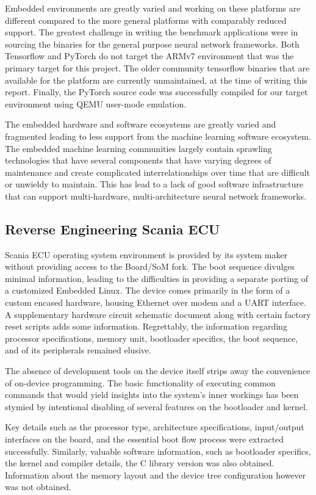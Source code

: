Embedded environments are greatly varied and working on these platforms are different compared to the more general platforms with comparably reduced support. The greatest challenge in writing the benchmark applications were in sourcing the binaries for the general purpose neural network frameworks. Both Tensorflow and PyTorch do not target the ARMv7 environment that was the primary target for this project. The older community tensorflow binaries that are available for the platform are currently unmaintained, at the time of writing this report. Finally, the PyTorch source code was successfully compiled for our target environment using QEMU user-mode emulation.

The embedded hardware and software ecosystems are greatly varied and fragmented leading to less support from the machine learning software ecosystem. The embedded machine learning communities largely contain sprawling technologies that have several components that have varying degrees of maintenance and create complicated interrelationships over time that are difficult or unwieldy to maintain. This has lead to a lack of good software infrastructure that can support multi-hardware, multi-architecture neural network frameworks.

\subsection{Reverse Engineering Scania ECU}

Scania ECU operating system environment is provided by its system maker without providing access to the Board/SoM fork. The boot sequence divulges minimal information, leading to the difficulties in providing a separate porting of a customized Embedded Linux. The device comes primarily in the form of a custom encased hardware, housing Ethernet over modem and a UART interface. A supplementary hardware circuit schematic document along with certain factory reset scripts adds some information. Regrettably, the information regarding processor specifications, memory unit, bootloader specifics, the boot sequence, and of its peripherals remained elusive.

The absence of development tools on the device itself strips away the convenience of on-device programming. The basic functionality of executing common commands that would yield insights into the system's inner workings has been stymied by intentional disabling of several features on the bootloader and kernel.

Key details such as the processor type, architecture specifications, input/output interfaces on the board, and the essential boot flow process were extracted successfully. Similarly, valuable software information, such as bootloader specifics, the kernel and compiler details, the C library version was also obtained. Information about the memory layout and the device tree configuration however was not obtained.

